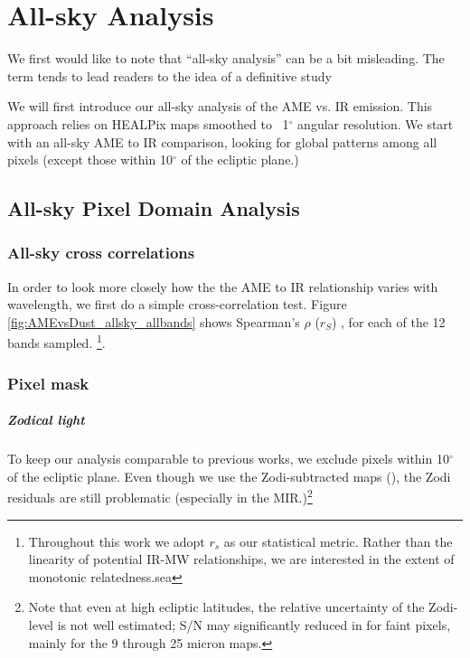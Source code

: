 \chapter{All-sky Analysis}
\label{sec:analysis}

    We first would like to note that ``all-sky analysis'' can be a bit misleading. The term tends to lead readers to the idea of a definitive study

    We will first introduce our all-sky analysis of the AME vs. IR emission. This approach relies on HEALPix maps smoothed to  ~1$^{\circ}$ angular resolution. We start with an all-sky AME to IR comparison, looking for global patterns among all pixels (except those within 10$^{\circ}$ of the ecliptic plane.)

\section{All-sky Pixel Domain Analysis}
  \subsection{All-sky cross correlations}
  	In order to look more closely how the the AME to IR relationship varies with wavelength, we first do a simple cross-correlation test. Figure \ref{fig:AMEvsDust_allsky_allbands} shows Spearman's $\rho$ ($r_{S}$)
    , for each of the 12 bands sampled. \footnote{Throughout this work we adopt $r_{s}$ as our statistical metric. Rather than the linearity of potential IR-MW relationships, we are interested in the extent of monotonic relatedness.sea }.

    \subsection{Pixel mask}
      \paragraph{Zodical light}
        To keep our analysis comparable to previous works, we exclude pixels within 10$^{\circ}$ of the ecliptic plane. Even though we use the Zodi-subtracted maps (\citep{kelsall98, kondo16}), the Zodi residuals are still problematic (especially in the MIR.)\footnote{Note that even at high ecliptic latitudes, the relative uncertainty of the Zodi-level is not well estimated; S/N may significantly reduced in for faint pixels, mainly for the 9 through 25 micron maps.}

